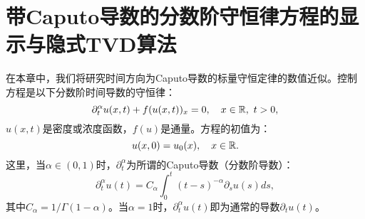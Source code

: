   
\chapter{带Caputo导数的分数阶守恒律方程的显示与隐式TVD算法}


在本章中，我们将研究时间方向为Caputo导数的标量守恒定律的数值近似。控制方程是以下分数阶时间导数的守恒律：
\begin{equation}\label{eq:main}
\partial_t^\alpha u(x,t) + f(u(x,t))_x = 0, \quad  x\in{\mathbb{R}}, \,\, t>0,
\end{equation}
$u(x,t)$是密度或浓度函数，$f(u)$是通量。方程的初值为：
\begin{equation}
u(x, 0) = u_0(x), \quad x\in{\mathbb{R}}.
\end{equation}
这里，当$\alpha\in (0,1)$时，$\partial_t^\alpha$为所谓的Caputo导数（分数阶导数）：
\[
\partial_t^\alpha u(t)=C_\alpha \int_0^t (t-s)^{-\alpha} \partial_s u(s)ds,
\]
其中$C_\alpha=1/\Gamma(1-\alpha)$。当$\alpha=1$时，$\partial_t^\alpha u (t)$即为通常的导数$\partial_t u(t)$。

